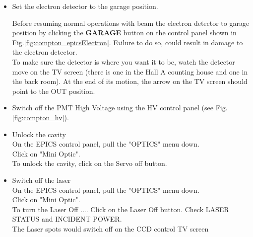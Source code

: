 {\begin{itemize}
        This procedure is only performed by MCC operators.
    
        
        The Hall A Run Coordinator must request that
        MCC turn OFF the Compton chicane and resume normal operations.
    
        MCC operators have to apply the section 3 of 
        the procedure MCC-PR-04-001\cite{compton_beam_tune}. Let's remind to the operator
       to close valves located on the Compton line. It is very important
       to keep the best vacuum in the Compton line and avoid
       dust deposit on the high reflectivity mirrors of the cavity
       
\item Set the electron detector to the garage position.

Before resuming normal operations with beam the electron detector to garage position by clicking 
the  {\bf GARAGE} button on the control panel shown in Fig.\ref{fig:compton_epicsElectron}. Failure to do so, could result in damage to the electron detector. \\


To make sure the detector is where you want it to be, watch the detector move on the TV screen (there is one in the Hall A counting house and one in the back room). At the end of its motion, the arrow on the TV screen should point to the OUT position.

\item  Switch off the PMT High Voltage using the HV  control panel (see Fig.\ref{fig:compton_hv}).

\item Unlock the cavity\\
On the EPICS control panel, pull the "OPTICS" menu down. \\
Click on "Mini Optic".\\
To unlock the cavity, click on the Servo off button.\\
\item Switch off the laser\\
On the EPICS control panel, pull the "OPTICS" menu down.\\
 Click on "Mini Optic".\\
 To turn the Laser Off .... Click on the Laser Off button.
 Check LASER STATUS and INCIDENT POWER.\\
 The Laser spots would switch off on the CCD control TV screen
\end {itemize}

}

